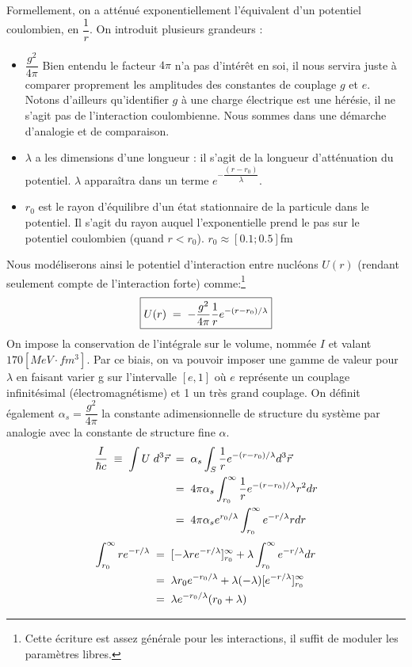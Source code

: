 Formellement, on a atténué exponentiellement l'équivalent d'un potentiel coulombien, en $\dfrac{1}{r}$. On introduit plusieurs grandeurs :
\begin{itemize}[label = $\bullet$]
    \item $\dfrac{g^2}{4\pi}$ Bien entendu le facteur $4\pi$ n'a pas d'intérêt en soi, il nous servira juste à comparer proprement les amplitudes des constantes de couplage $g$ et $e$. Notons d'ailleurs qu'identifier $g$ à une charge électrique est une hérésie, il ne s'agit pas de l'interaction coulombienne. Nous sommes dans une démarche d'analogie et de comparaison.
    \item $\lambda$ a les dimensions d'une longueur : il s'agit de la longueur d'atténuation du potentiel. $\lambda$ apparaîtra dans un terme $e^{-\dfrac{(r-r_0)}{\lambda}}$.
    \item $r_0$ est le rayon d'équilibre d'un état stationnaire de la particule dans le potentiel. Il s'agit du rayon auquel l'exponentielle prend le pas sur le potentiel coulombien (quand $r<r_0$). $r_0 \approx [0.1;0.5]$fm
\end{itemize}
Nous modéliserons ainsi le potentiel d'interaction entre nucléons $U(r)$ (rendant seulement compte de l'interaction forte) comme:\footnote{Cette écriture est assez générale pour les interactions, il suffit de moduler les paramètres libres.}
\begin{equation*}
\boxed{
    U(r) \; = \; -\dfrac{g^2}{4\pi} \dfrac{1}{r}e^{-(r-r_0)/\lambda}
    }
\end{equation*}
On impose la conservation de l'intégrale sur le volume, nommée $I$ et valant $170 [MeV \cdot fm^3]$. Par ce biais, on va pouvoir imposer une gamme de valeur pour $\lambda$ en faisant varier g sur l'intervalle $[e,1]$ où $e$ représente un couplage infinitésimal (électromagnétisme) et 1 un très grand couplage. On définit également $\alpha_s = \dfrac{g^2}{4\pi}$ la constante adimensionnelle de structure du système par analogie avec la constante de structure fine $\alpha$.
\begin{align*}
    \dfrac{I}{\hbar c}  
    \;\equiv\; \int U \; d^3\Vec{r}
    &\; = \; \alpha_s \int_S \dfrac{1}{r}e^{-(r-r_0)/\lambda} d^3\Vec{r}\\
    &\; = \; 4\pi \alpha_s \int_{r_0}^\infty \dfrac{1}{r}e^{-(r-r_0)/\lambda} r^2 dr\\
    &\; = \; 4\pi\alpha_s e^{r_0/\lambda} \int_{r_0}^\infty e^{-r/\lambda} r dr
\end{align*}
\begin{align*}
    \int_{r_0}^\infty re^{-r/\lambda} &\; = \; [-\lambda r e^{-r/\lambda}]_{r_0}^\infty + \lambda\int_{r_0}^\infty e^{-r/\lambda}dr\\
    &\; = \; \lambda r_0 e^{-r_0/\lambda} + \lambda (-\lambda)[e^{-r/\lambda}]_{r_0}^\infty\\
    &\; = \; \lambda e^{-r_0/\lambda}(r_0 + \lambda)
\end{align*}
